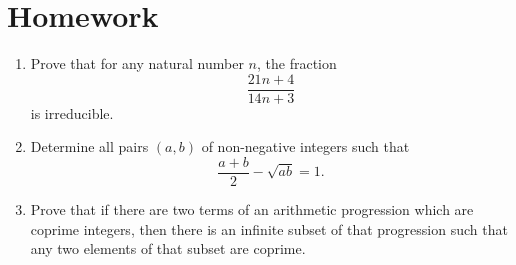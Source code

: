 \documentclass{article}
\begin{document}
\section{Homework}
  \begin{enumerate}
    \item Prove that for any natural number $n$, the fraction
      \[\frac{21n+4}{14n+3}\]
      is irreducible.
    \item Determine all pairs $(a,b)$ of non-negative integers such that
      \[\frac{a+b}2-\sqrt{ab}=1.\]
    \item Prove that if there are two terms of an arithmetic progression which are
      coprime integers, then there is an infinite subset of that
      progression such that any two elements of that subset are coprime.
  \end{enumerate}
\end{document}
